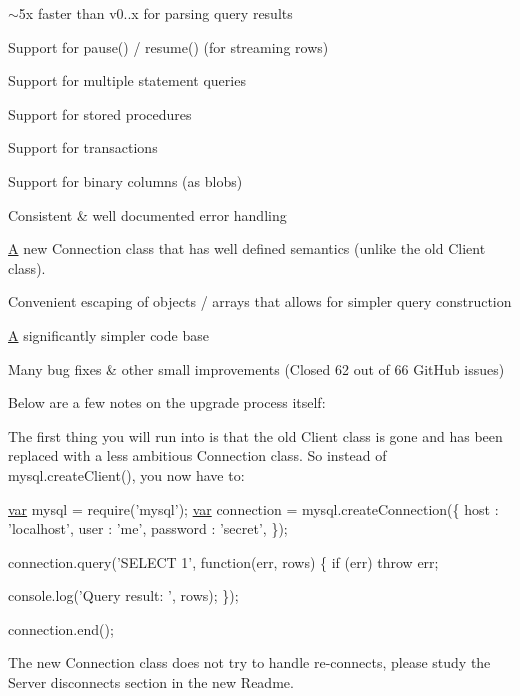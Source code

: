 \begin{DoxyItemize}
\item $\sim$5x faster than v0..\+x for parsing query results
\item Support for pause() / resume() (for streaming rows)
\item Support for multiple statement queries
\item Support for stored procedures
\item Support for transactions
\item Support for binary columns (as blobs)
\item Consistent \& well documented error handling
\item \hyperlink{class_a}{A} new Connection class that has well defined semantics (unlike the old Client class).
\item Convenient escaping of objects / arrays that allows for simpler query construction
\item \hyperlink{class_a}{A} significantly simpler code base
\item Many bug fixes \& other small improvements (Closed 62 out of 66 Git\+Hub issues)
\end{DoxyItemize}

Below are a few notes on the upgrade process itself\+:

The first thing you will run into is that the old {\ttfamily Client} class is gone and has been replaced with a less ambitious {\ttfamily Connection} class. So instead of {\ttfamily mysql.\+create\+Client()}, you now have to\+:


\begin{DoxyCode}
\hyperlink{018__def_8c_a335628f2e9085305224b4f9cc6e95ed5}{var} mysql      = require(\textcolor{stringliteral}{'mysql'});
\hyperlink{018__def_8c_a335628f2e9085305224b4f9cc6e95ed5}{var} connection = mysql.createConnection(\{
  host     : \textcolor{stringliteral}{'localhost'},
  user     : \textcolor{stringliteral}{'me'},
  password : \textcolor{stringliteral}{'secret'},
\});

connection.query(\textcolor{stringliteral}{'SELECT 1'}, \textcolor{keyword}{function}(err, rows) \{
  \textcolor{keywordflow}{if} (err) \textcolor{keywordflow}{throw} err;

  console.log(\textcolor{stringliteral}{'Query result: '}, rows);
\});

connection.end();
\end{DoxyCode}


The new {\ttfamily Connection} class does not try to handle re-\/connects, please study the {\ttfamily Server disconnects} section in the new Readme.

